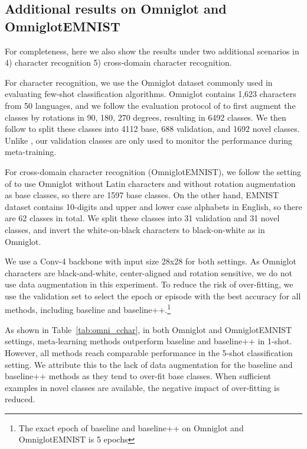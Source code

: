 \documentclass{article}
\newcommand{\tabref}[1]{Table~\ref{tab:#1}}
\begin{document}
%
 
\subsection{Additional results on Omniglot and OmniglotEMNIST}
For completeness, here we also show the results under two additional scenarios in 4) character recognition 5) cross-domain character recognition.

For character recognition, we use the Omniglot dataset \cite{lake2011one} commonly used in evaluating few-shot classification algorithms. Omniglot contains 1,623 characters from 50 languages, and we follow the evaluation protocol of \cite{vinyals2016matching} to first augment the classes by rotations in 90, 180, 270 degrees, resulting in 6492 classes. We then follow \cite{snell2017prototypical} to split these classes into 4112 base, 688 validation, and 1692 novel classes. Unlike \cite{snell2017prototypical}, our validation classes are only used to monitor the performance during meta-training.

For cross-domain character recognition (OmniglotEMNIST), we follow the setting of \cite{dong2018domain} to use Omniglot without Latin characters and without rotation augmentation as base classes, so there are 1597 base classes. On the other hand, EMNIST dataset \cite{cohen2017emnist} contains 10-digits and upper and lower case alphabets in English, so there are 62 classes in total. We split these classes into 31 validation and 31 novel classes, and invert the white-on-black characters to black-on-white as in  Omniglot. 

We use a Conv-4 backbone with input size 28x28 for both settings. As Omniglot characters are black-and-white, center-aligned and rotation sensitive, we do not use data augmentation in this experiment. To reduce the risk of over-fitting, we use the validation set to select the epoch or episode with the best accuracy for all methods, including baseline and baseline++.\footnote{The exact epoch of baseline and baseline++ on Omniglot and OmniglotEMNIST is 5 epochs} 

As shown in \tabref{omni_cchar}, in both Omniglot and OmniglotEMNIST settings, meta-learning methods outperform baseline and baseline++ in 1-shot. However, all methods reach comparable performance in the 5-shot classification setting. We attribute this to the lack of data augmentation for the baseline and baseline++ methods as they tend to over-fit base classes. When sufficient examples in novel classes are available, the negative impact of over-fitting is reduced.
\end{document}

